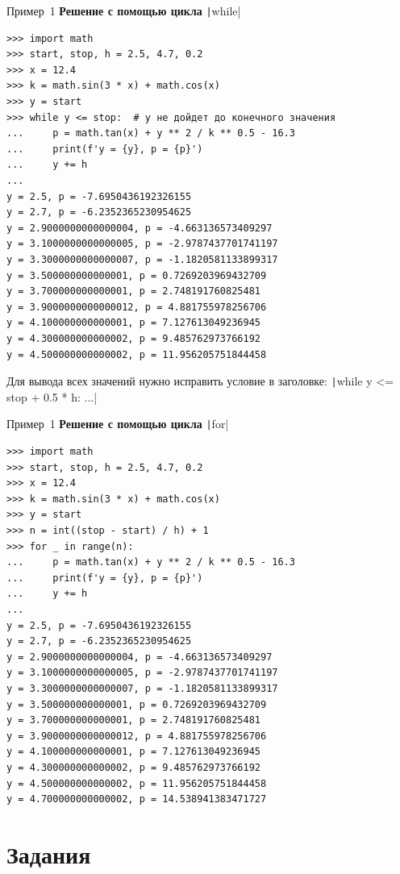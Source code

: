 \documentclass[aspectratio=169]{beamer}	%
\begin{document}
\begin{frame}[fragile]{Пример~1}
\scriptsize
\textbf{Решение с помощью цикла} \texttt|while|
\begin{verbatim}
>>> import math
>>> start, stop, h = 2.5, 4.7, 0.2
>>> x = 12.4
>>> k = math.sin(3 * x) + math.cos(x)
>>> y = start
>>> while y <= stop:  # y не дойдет до конечного значения
...     p = math.tan(x) + y ** 2 / k ** 0.5 - 16.3
...     print(f'y = {y}, p = {p}')
...     y += h
...
y = 2.5, p = -7.6950436192326155
y = 2.7, p = -6.2352365230954625
y = 2.9000000000000004, p = -4.663136573409297
y = 3.1000000000000005, p = -2.9787437701741197
y = 3.3000000000000007, p = -1.1820581133899317
y = 3.500000000000001, p = 0.7269203969432709
y = 3.700000000000001, p = 2.748191760825481
y = 3.9000000000000012, p = 4.881755978256706
y = 4.100000000000001, p = 7.127613049236945
y = 4.300000000000002, p = 9.485762973766192
y = 4.500000000000002, p = 11.956205751844458
\end{verbatim}
Для вывода всех значений нужно исправить условие в заголовке: \texttt|while y <= stop + 0.5 * h: ...|
\vfill
\end{frame}

\begin{frame}[fragile]{Пример~1}
\scriptsize
\textbf{Решение с помощью цикла} \texttt|for|
\begin{verbatim}
>>> import math
>>> start, stop, h = 2.5, 4.7, 0.2
>>> x = 12.4
>>> k = math.sin(3 * x) + math.cos(x)
>>> y = start
>>> n = int((stop - start) / h) + 1
>>> for _ in range(n):
...     p = math.tan(x) + y ** 2 / k ** 0.5 - 16.3
...     print(f'y = {y}, p = {p}')
...     y += h
...
y = 2.5, p = -7.6950436192326155
y = 2.7, p = -6.2352365230954625
y = 2.9000000000000004, p = -4.663136573409297
y = 3.1000000000000005, p = -2.9787437701741197
y = 3.3000000000000007, p = -1.1820581133899317
y = 3.500000000000001, p = 0.7269203969432709
y = 3.700000000000001, p = 2.748191760825481
y = 3.9000000000000012, p = 4.881755978256706
y = 4.100000000000001, p = 7.127613049236945
y = 4.300000000000002, p = 9.485762973766192
y = 4.500000000000002, p = 11.956205751844458
y = 4.700000000000002, p = 14.538941383471727
\end{verbatim}
\vfill
\end{frame}


\section{Задания}
\sectionframe
\end{document}
